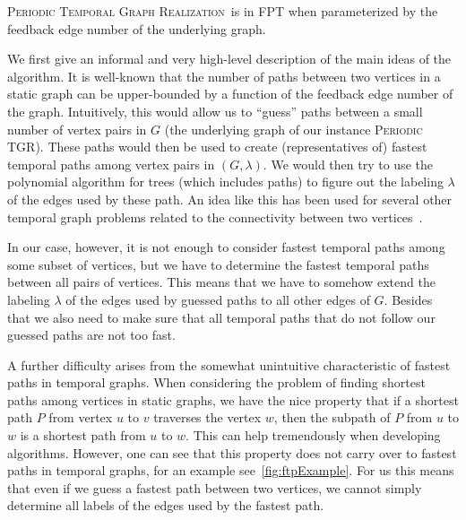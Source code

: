 \documentclass[a4paper,UKenglish,cleveref, autoref, thm-restate]{lipics-v2021}
\newcommand{\ie}{i.\,e.,\ }
\newcommand{\deltaExactLong}{\textsc{Periodic Temporal Graph Realization}}
\newcommand{\deltaExact}{\textsc{Periodic TGR}}
\begin{document}
\begin{theorem}\label{thm:FPTwrtFES}
    \deltaExactLong\ is in FPT when parameterized by the feedback edge number of the underlying graph.
\end{theorem}

We first give an informal and very high-level description of the main ideas of the algorithm. It is well-known that the number of paths between two vertices in a static graph can be upper-bounded by a function of the feedback edge number of the graph. Intuitively, this would allow us to ``guess'' paths between a small number of vertex pairs in $G$ (the underlying graph of our instance \deltaExact). These paths would then be used to create (representatives of) fastest temporal paths among vertex pairs in $(G,\lambda)$. We would then try to use the polynomial algorithm for trees (which includes paths) to figure out the labeling $\lambda$ of the edges used by these path. An idea like this has been used for several other temporal graph problems related to the connectivity between two vertices~\cite{casteigts2021finding,FMNR22a,EMM22}.

In our case, however, it is not enough to consider fastest temporal paths among some subset of vertices, but we have to determine the fastest temporal paths between all pairs of vertices. This means that we have to somehow extend the labeling $\lambda$ of the edges used by guessed paths to all other edges of $G$.
Besides that we also need to make sure that all temporal paths that do not follow our guessed paths are not too fast. 

	A further difficulty arises from the somewhat unintuitive characteristic of fastest paths in temporal graphs.
 When considering the problem of finding shortest paths among vertices in static graphs, we have the nice property that if a shortest path $P$ from vertex $u$ to $v$ traverses the vertex $w$,
	then the subpath of $P$ from $u$ to $w$ is a shortest path from $u$ to $w$. This can help tremendously when developing algorithms.
	However, one can see that this property does not carry over to fastest paths in temporal graphs, for an example see~\cref{fig:ftpExample}.
 For us this means that even if we guess a fastest path between two vertices, we cannot simply determine all labels of the edges used by the fastest path.
	
\end{document}
